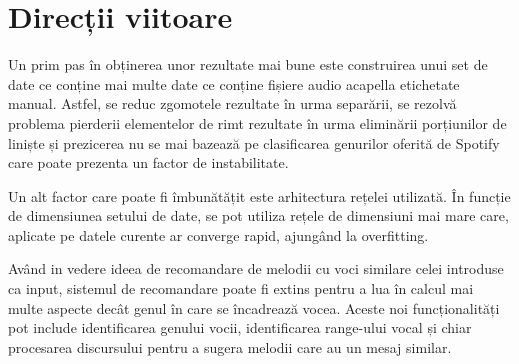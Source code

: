 \section{Direcții viitoare}
Un prim pas în obținerea unor rezultate mai bune este construirea unui set de date ce conține mai multe date ce conține fișiere audio acapella etichetate manual.
Astfel, se reduc zgomotele rezultate în urma separării, se rezolvă problema pierderii
elementelor de rimt rezultate în urma eliminării porțiunilor de liniște și prezicerea nu se mai bazează pe clasificarea genurilor oferită de Spotify care
poate prezenta un factor de instabilitate.

Un alt factor care poate fi îmbunătățit este arhitectura rețelei utilizată. În funcție de dimensiunea setului de date, se pot utiliza rețele de dimensiuni mai
mare care, aplicate pe datele curente ar converge rapid, ajungând la overfitting.

Având in vedere ideea de recomandare de melodii cu voci similare celei introduse ca input, sistemul de recomandare poate fi extins pentru a lua în calcul
mai multe aspecte decât genul în care se încadrează vocea. Aceste noi funcționalități pot include identificarea genului vocii, identificarea range-ului
vocal și chiar procesarea discursului pentru a sugera melodii care au un mesaj similar.
